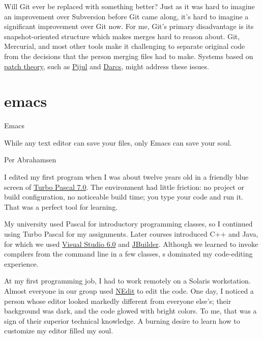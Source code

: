 \documentclass{article}
\begin{document}
Will Git ever be replaced with something better?
Just as it was hard to imagine an improvement over Subversion before Git came along, it's hard to imagine a significant improvement over Git now.
For me, Git's primary disadvantage is its snapshot-oriented structure which makes merges hard to reason about.
Git, Mercurial, and most other tools make it challenging to separate original code from the decisions that the person merging files had to make.
Systems based on \href{https://en.m.wikibooks.org/wiki/Understanding_Darcs/Patch_theory}{patch theory}, such as \href{https://pijul.org/}{Pijul} and \href{https://darcs.net/}{Darcs}, might address these issues.

\section{emacs}{Emacs}

\epigraph{
  While any text editor can save your files, only Emacs can save your soul.
}{Per Abrahamsen}

I edited my first program when I was about twelve years old in a friendly blue screen of \href{https://en.wikipedia.org/wiki/Turbo_Pascal}{Turbo Pascal 7.0}.
The environment had little friction: no project or build configuration, no noticeable build time; you type your code and run it.
That was a perfect tool for learning.

My university used Pascal for introductory programming classes, so I continued using Turbo Pascal for my assignments.
Later courses introduced C++ and Java, for which we used \href{https://en.wikipedia.org/wiki/Visual_Studio#6.0_(1998)}{Visual Studio 6.0} and \href{https://en.wikipedia.org/wiki/JBuilder}{JBuilder}.
Although we learned to invoke compilers from the command line in a few classes, s dominated my code-editing experience.

At my first programming job, I had to work remotely on a Solaris workstation.
Almost everyone in our group used \href{https://en.wikipedia.org/wiki/NEdit}{NEdit} to edit the code.
One day, I noticed a person whose editor looked markedly different from everyone else's; their background was dark, and the code glowed with bright colors.
To me, that was a sign of their superior technical knowledge.
A burning desire to learn how to customize my editor filled my soul.
\end{document}
